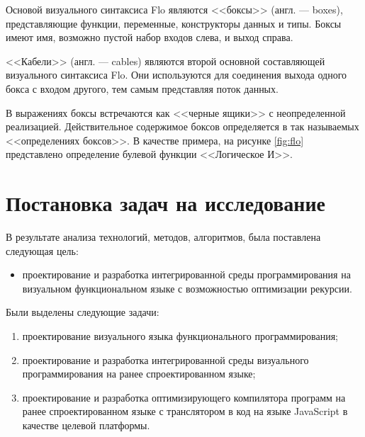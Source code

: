 \FloatBarrier

Основой визуального синтаксиса Flo являются <<боксы>> (англ. --- boxes), 
представляющие функции, переменные, конструкторы данных и типы. 
Боксы имеют имя, возможно пустой набор входов слева, и выход справа.

<<Кабели>> (англ. --- cables) являются второй основной составляющей
визуального синтаксиса Flo. Они используются для соединения выхода
одного бокса с входом другого, тем самым представляя поток данных.

В выражениях боксы встречаются как <<черные ящики>> с неопределенной
реализацией. Действительное содержимое боксов определяется в так
называемых <<определениях боксов>>. В качестве примера, на рисунке
\ref{fig:flo} представлено определение булевой функции <<Логическое И>>.

\section{Постановка задач на исследование}\label{sec:ch1/sec9}

В результате анализа технологий, методов, алгоритмов, была поставлена следующая цель:

\begin{itemize}
    \item проектирование и разработка интегрированной среды программирования на визуальном функциональном языке с возможностью оптимизации рекурсии.
\end{itemize}

Были выделены следующие задачи:

\begin{enumerate}
    \item проектирование визуального языка функционального программирования;
    \item проектирование и разработка интегрированной среды визуального программирования на ранее спроектированном языке;
    \item проектирование и разработка оптимизирующего компилятора программ на ранее спроектированном языке с транслятором в код на языке JavaScript в качестве целевой платформы.
\end{enumerate}

\nocite{*}

\FloatBarrier